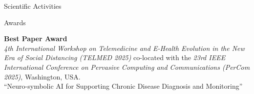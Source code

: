 \documentclass{resume} %
\begin{document}
\begin{rSection}{Scientific Activities}
        \begin{rSubsection2}{Awards}
            \item \textbf{Best Paper Award}
            \\
            \textit{4th International Workshop on Telemedicine and E-Health Evolution in the New Era of Social Distancing (TELMED 2025)} co-located with the \textit{23rd IEEE International Conference on Pervasive Computing and Communications (PerCom 2025)}, Washington, USA.
            \\
            ``Neuro-symbolic AI for Supporting Chronic Disease Diagnosis and Monitoring''

        \end{rSubsection2}

    \end{rSection}


\end{document}
